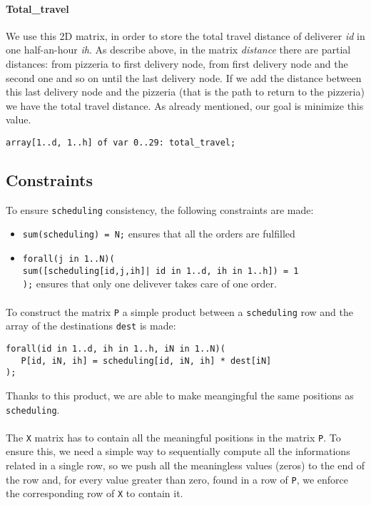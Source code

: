 \documentclass[10pt]{article}
\begin{document}
	\paragraph*{Total\_travel}
	We use this 2D matrix, in order to store the total travel distance of deliverer \textit{id} in one half-an-hour \textit{ih}.
	As describe above, in the matrix \textit{distance} there are partial distances: from pizzeria to first delivery node, 
	from first delivery node and the second one and so on until the last delivery node.
	If we add the distance between this last delivery node and the pizzeria (that is the path to return to the pizzeria)
	we have the total travel distance.
	As already mentioned, our goal is minimize this value.

	\begin{center}
		\texttt{array[1..d, 1..h] of var 0..29: total\_travel;}
	\end{center}

	\subsection{Constraints}

	To ensure \texttt{scheduling} consistency, the following constraints are made:
	\begin{itemize}
		\item \texttt{sum(scheduling) = N;} ensures that all the orders are fulfilled %
		\item \texttt{forall(j in 1..N)(\\
			sum([scheduling[id,j,ih]| id in 1..d, ih in 1..h]) = 1\\
		  );} ensures that only one delivever takes care of one order. 
	\end{itemize}

	\paragraph*{}
	To construct the matrix \texttt{P} a simple product between a \texttt{scheduling} row and the array of the destinations \texttt{dest} is
	made:
	\begin{verbatim}
forall(id in 1..d, ih in 1..h, iN in 1..N)(
   P[id, iN, ih] = scheduling[id, iN, ih] * dest[iN]
);
	\end{verbatim}
	
	Thanks to this product, we are able to make meangingful the same positions
	as \texttt{scheduling}.

	\paragraph*{}
	The \texttt{X} matrix has to contain all the meaningful	positions in the matrix
	\texttt{P}. To ensure this, we need a simple way to sequentially compute all the
	informations related in a single row, so we push all the meaningless values (zeros)
	to the end of the row and, for every value greater than zero, found in a row of
	\texttt{P}, we enforce the corresponding row of \texttt{X} to contain it.
\end{document}
